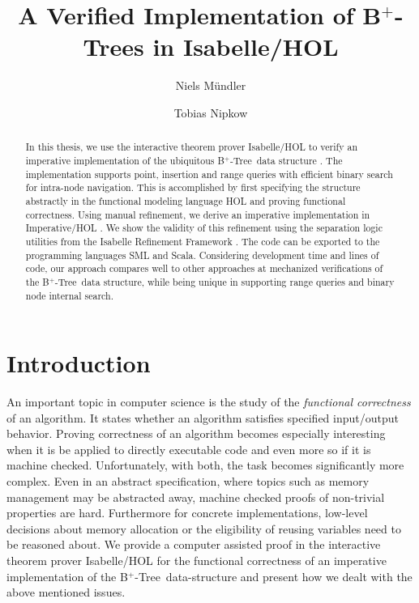 \documentclass[a4paper,UKenglish,cleveref, autoref, thm-restate]{lipics-v2021}
\title{A Verified Implementation of B$^+$-Trees in Isabelle/HOL}
\author{Niels Mündler}{Department of Computer Science, ETH Zurich, Switzerland}{n.muendler@tum.de}{https://orcid.org/0000-0003-3851-2557}{}%
\author{Tobias Nipkow}{Department of Informatics, Technical University of Munich, Germany}{nipkow@in.tum.de}{https://orcid.org/0000-0003-0730-515X}{}
\newcommand{\btree}{B$^+$-Tree}
\begin{document}
\maketitle

\begin{abstract}
    In this thesis, we use the interactive theorem prover Isabelle/HOL \cite{DBLP:books/sp/NipkowPW02} to verify
    an imperative implementation of the ubiquitous \btree\ data structure \cite{DBLP:journals/acta/BayerM72}.
    The implementation supports point, insertion and range queries with efficient binary
    search for intra-node navigation. This is accomplished by first specifying the structure
    abstractly in the functional modeling language HOL and proving functional correctness.
    Using manual refinement, we derive an imperative implementation in Imperative/HOL
    \cite{DBLP:conf/tphol/BulwahnKHEM08}. We show the validity of this refinement using the separation logic utilities
    from the Isabelle Refinement Framework \cite{DBLP:conf/itp/Lammich19}. The code can be exported to the
    programming languages SML and Scala. Considering development time and lines of code, our approach
    compares well to other approaches at mechanized verifications of the \btree\ data
    structure, while being unique in supporting range queries and binary node internal search.
\end{abstract}

\section{Introduction}
\label{sec:introduction}


An important topic in computer science is the study of the
\textit{functional correctness} of an algorithm.
It states whether an algorithm satisfies specified
input/output behavior.
Proving correctness of an algorithm
becomes especially interesting when it is be applied
to directly executable code and even more so if it is machine checked.
Unfortunately, with both, the task becomes
significantly more complex.
Even in an abstract specification, where topics such as
memory management may be abstracted away,
machine checked proofs of non-trivial properties
are hard.
Furthermore for concrete implementations,
low-level decisions about memory allocation or
the eligibility of reusing variables need to be
reasoned about.
We provide a computer assisted proof in the interactive
theorem prover Isabelle/HOL \cite{DBLP:books/sp/NipkowPW02} for the functional
correctness of an imperative implementation of the \btree\ data-structure
and present how we dealt with the above mentioned issues.
\end{document}
